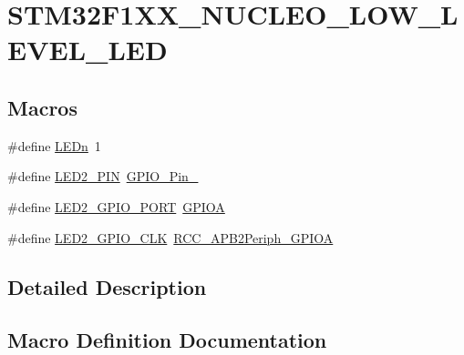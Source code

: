 \hypertarget{group___s_t_m32_f1_x_x___n_u_c_l_e_o___l_o_w___l_e_v_e_l___l_e_d}{}\section{S\+T\+M32\+F1\+X\+X\+\_\+\+N\+U\+C\+L\+E\+O\+\_\+\+L\+O\+W\+\_\+\+L\+E\+V\+E\+L\+\_\+\+L\+ED}
\label{group___s_t_m32_f1_x_x___n_u_c_l_e_o___l_o_w___l_e_v_e_l___l_e_d}
\subsection*{Macros}
\begin{DoxyCompactItemize}
\item 
\#define \mbox{\hyperlink{group___s_t_m32_f1_x_x___n_u_c_l_e_o___l_o_w___l_e_v_e_l___l_e_d_gab4be2480bf7d44d52aab1190a65a733c}{L\+E\+Dn}}~1
\item 
\#define \mbox{\hyperlink{group___s_t_m32_f1_x_x___n_u_c_l_e_o___l_o_w___l_e_v_e_l___l_e_d_gaf6f84078113b55354d20585131b386f7}{L\+E\+D2\+\_\+\+P\+IN}}~\mbox{\hyperlink{group___g_p_i_o__pins__define_ga32dbe930f52ce5ab60190c65e9dc741e}{G\+P\+I\+O\+\_\+\+Pin\+\_}}
\item 
\#define \mbox{\hyperlink{group___s_t_m32_f1_x_x___n_u_c_l_e_o___l_o_w___l_e_v_e_l___l_e_d_gaf88822ae4b79d37c7735ce1160b59f68}{L\+E\+D2\+\_\+\+G\+P\+I\+O\+\_\+\+P\+O\+RT}}~\mbox{\hyperlink{group___peripheral__declaration_gac485358099728ddae050db37924dd6b7}{G\+P\+I\+OA}}
\item 
\#define \mbox{\hyperlink{group___s_t_m32_f1_x_x___n_u_c_l_e_o___l_o_w___l_e_v_e_l___l_e_d_ga972d10beb8aa0aa7a6edf70e5a6200ff}{L\+E\+D2\+\_\+\+G\+P\+I\+O\+\_\+\+C\+LK}}~\mbox{\hyperlink{group___a_p_b2__peripheral_ga44b92fbf2e288796b1acbce2708f3636}{R\+C\+C\+\_\+\+A\+P\+B2\+Periph\+\_\+\+G\+P\+I\+OA}}
\end{DoxyCompactItemize}


\subsection{Detailed Description}


\subsection{Macro Definition Documentation}
\mbox{\label{group___s_t_m32_f1_x_x___n_u_c_l_e_o___l_o_w___l_e_v_e_l___l_e_d_ga972d10beb8aa0aa7a6edf70e5a6200ff}} 
